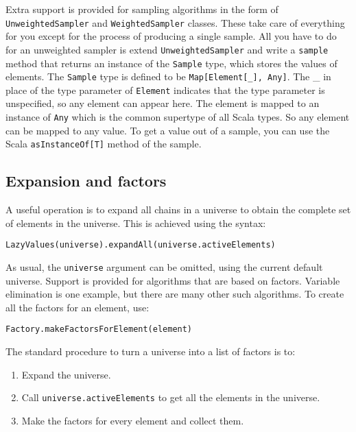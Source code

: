 Extra support is provided for sampling algorithms in the form of \texttt{UnweightedSampler} and \texttt{WeightedSampler} classes. These take care of everything for you except for the process of producing a single sample. All you have to do for an unweighted sampler is extend \texttt{Unweight\-edSampler} and write a \texttt{sample} method that returns an instance of the \texttt{Sample} type, which stores the values of elements. The \texttt{Sample} type is defined to be \texttt{Map[Element[\_], Any]}. The \_ in place of the type parameter of \texttt{Element} indicates that the type parameter is unspecified, so any element can appear here. The element is mapped to an instance of \texttt{Any} which is the common supertype of all Scala types. So any element can be mapped to any value. To get a value out of a sample, you can use the Scala \texttt{asInstanceOf[T]} method of the sample.

\subsection{Expansion and factors}

A useful operation is to expand all chains in a universe to obtain the complete set of elements in the universe. This is achieved using the syntax:

\begin{flushleft}
\texttt{LazyValues(universe).expandAll(universe.activeElements)}
\end{flushleft}

As usual, the \texttt{universe} argument can be omitted, using the current default universe. Support is provided for algorithms that are based on factors. Variable elimination is one example, but there are many other such algorithms. To create all the factors for an element, use:

\begin{flushleft}
\texttt{Factory.makeFactorsForElement(element)}
\end{flushleft}

The standard procedure to turn a universe into a list of factors is to:
\begin{enumerate}
\item Expand the universe.
\item Call \texttt{universe.activeElements} to get all the elements in the universe.
\item Make the factors for every element and collect them.
\end{enumerate}

